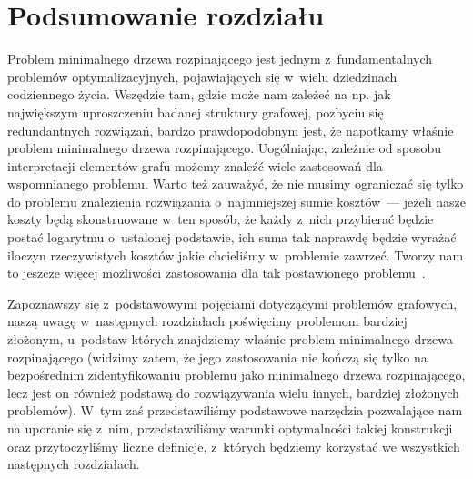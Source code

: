 \section{Podsumowanie rozdziału}




Problem minimalnego drzewa rozpinającego jest jednym z~fundamentalnych problemów optymalizacyjnych, pojawiających się w~wielu dziedzinach codziennego życia.
Wszędzie tam, gdzie może nam zależeć na np. jak największym uproszczeniu badanej struktury grafowej, pozbyciu się redundantnych rozwiązań, bardzo prawdopodobnym jest, że napotkamy właśnie problem minimalnego drzewa rozpinającego.
Uogólniając, zależnie od sposobu interpretacji elementów grafu możemy znaleźć wiele zastosowań dla wspomnianego problemu.
Warto też zauważyć, że nie musimy ograniczać się tylko do problemu znalezienia rozwiązania o~najmniejszej sumie kosztów~--- jeżeli nasze koszty będą skonstruowane w~ten sposób, że każdy z~nich przybierać będzie postać logarytmu o~ustalonej podstawie, ich suma tak naprawdę będzie wyrażać iloczyn rzeczywistych kosztów jakie chcieliśmy w~problemie zawrzeć.
Tworzy nam to jeszcze więcej możliwości zastosowania dla tak postawionego problemu~\cite[$512$--$516$]{Ahuja:1993:NFT:137406}.

Zapoznawszy się z~podstawowymi pojęciami dotyczącymi problemów grafowych, naszą uwagę w~następnych rozdziałach poświęcimy problemom bardziej złożonym, u~podstaw których znajdziemy właśnie problem minimalnego drzewa rozpinającego (widzimy zatem, że jego zastosowania nie kończą się tylko na bezpośrednim zidentyfikowaniu problemu jako minimalnego drzewa rozpinającego, lecz jest on również podstawą do rozwiązywania wielu innych, bardziej złożonych problemów).
W~tym zaś przedstawiliśmy podstawowe narzędzia pozwalające nam na uporanie się z~nim, przedstawiliśmy warunki optymalności takiej konstrukcji oraz przytoczyliśmy liczne definicje, z~których będziemy korzystać we wszystkich następnych rozdziałach.
